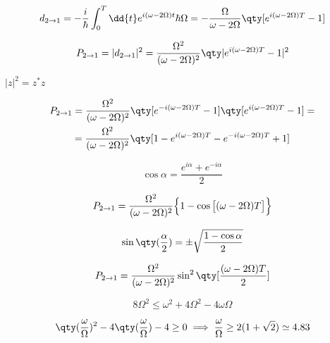 \begin{soluzione}
{   \begin{equation*}
      d_{2 \to 1}
      =-\frac{i}{\hbar} \int_{0}^{T} \dd{t} e^{i( \omega - 2\Omega ) t} \hbar \Omega
      =-\frac{\Omega}{\omega - 2\Omega} \qty[ e^{i(\omega - 2\Omega)T} - 1 ]
   \end{equation*}

   \begin{equation*}
      P_{2 \to 1}
      =| d_{2 \to 1} |^2
      =\frac{\Omega^2}{(\omega - 2\Omega)^2} \qty| e^{i(\omega - 2\Omega)T} - 1 |^2
   \end{equation*}
   
   $|z|^2=z^*z$

   \begin{gather*}
      P_{2 \to 1}
      =\frac{\Omega^2}{(\omega - 2\Omega)^2} \qty[ e^{-i(\omega - 2\Omega)T} - 1 ] \qty[ e^{i(\omega - 2\Omega)T} - 1 ]=
      \\
      =\frac{\Omega^2}{(\omega - 2\Omega)^2} \qty[ 1 - e^{i(\omega - 2\Omega)T} - e^{-i(\omega - 2\Omega)T} + 1 ]
   \end{gather*}

   \begin{equation*}
      \cos{\alpha}=\frac{e^{i\alpha} + e^{-i\alpha}}{2}
   \end{equation*}

   \begin{equation*}
      P_{2 \to 1}
      =\frac{\Omega^2}{(\omega - 2\Omega)^2} \Bigl\{ 1 - \cos{ \bigl[ (\omega - 2\Omega) T \bigr] } \Bigr\}
   \end{equation*}

   \begin{equation*}
      \sin{\qty( \frac{\alpha}{2} )}
      =\pm \sqrt{ \frac{1 - \cos{\alpha}}{2} }
   \end{equation*}

   \begin{equation*}
      P_{2 \to 1}
      =\frac{\Omega^2}{(\omega - 2\Omega)^2} \sin^2{ \qty[ \frac{ (\omega - 2\Omega) T }{2} ] }
   \end{equation*}

   \begin{equation*}
      8\Omega^2 \leq \omega^2 + 4\Omega^2 - 4\omega\Omega
   \end{equation*}

   \begin{equation*}
      \qty( \frac{\omega}{\Omega} )^2 - 4\qty( \frac{\omega}{\Omega} ) - 4 \geq 0
      \implies
      \frac{\omega}{\Omega} \geq 2 ( 1 + \sqrt{2} ) \simeq 4.83
   \end{equation*}
   }
\end{soluzione}

